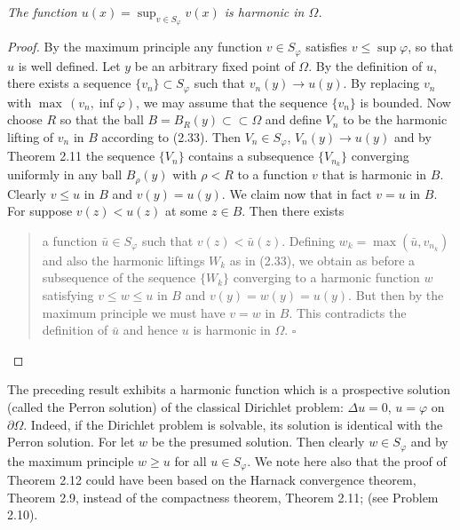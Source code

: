 \medskip
\begin{theorem}\label{gt.thm2.12}
\emph{The function $u(x)=\sup_{v\in S_\varphi}v(x)$ is harmonic in $\Omega$.}

\medskip
\begin{proof}
By the maximum principle any function $v\in S_\varphi$ satisfies $v\leq \sup \varphi$, so that $u$ is well defined. Let $y$ be an arbitrary fixed point of $\Omega$. By the definition of $u$, there exists a sequence $\{v_n\}\subset S_\varphi$ such that $v_n(y)\to u(y)$. By replacing $v_n$ with $\max\,(v_n,\inf\varphi)$, we may assume that the sequence $\{v_n\}$ is bounded. Now choose $R$ so that the ball $B=B_R(y)\subset\subset\Omega$ and define $V_n$ to be the harmonic lifting of $v_n$ in $B$ according to (2.33). Then $V_n\in S_\varphi$, $V_n(y)\to u(y)$ and by Theorem 2.11 the sequence $\{V_n\}$ contains a subsequence $\{V_{n_k}\}$ converging uniformly in any ball $B_\rho(y)$ with $\rho<R$ to a function $v$ that is harmonic in $B$. Clearly $v\leq u$ in $B$ and $v(y)=u(y)$. We claim now that in fact $v=u$ in $B$. For suppose $v(z)<u(z)$ at some $z\in B$. Then there exists



\begin{quote}
a function $\bar{u} \in S_{\varphi}$ such that $v(z) < \bar{u}(z)$. Defining $w_k = \max(\bar{u}, v_{n_k})$ and also the harmonic liftings $W_k$ as in (2.33), we obtain as before a subsequence of the sequence $\{W_k\}$ converging to a harmonic function $w$ satisfying $v \leq w \leq u$ in $B$ and $v(y)=w(y)=u(y)$. But then by the maximum principle we must have $v=w$ in $B$. This contradicts the definition of $\bar{u}$ and hence $u$ is harmonic in $\Omega$. $\square$
\end{quote}
\end{proof}
\end{theorem}

The preceding result exhibits a harmonic function which is a prospective solution (called the Perron solution) of the classical Dirichlet problem: $\Delta u = 0$, $u = \varphi$ on $\partial \Omega$. Indeed, if the Dirichlet problem is solvable, its solution is identical with the Perron solution. For let $w$ be the presumed solution. Then clearly $w \in S_{\varphi}$ and by the maximum principle $w \geq u$ for all $u \in S_{\varphi}$. We note here also that the proof of Theorem 2.12 could have been based on the Harnack convergence theorem, Theorem 2.9, instead of the compactness theorem, Theorem 2.11; (see Problem 2.10).

